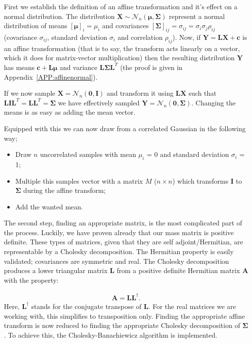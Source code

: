 First we establish the definition of an affine transformation and it's effect on a normal distribution. The distribution $\mathbf{X} \sim \mathcal{N}_n \left( \bm{\mu}, \bm{\Sigma} \right)$ represent a normal distribution of means $\left[\bm{\mu}\right]_i = \mu_i$ and covariances $\left[ \bm{\Sigma} \right]_{ij} = \sigma_{ij} = \sigma_i \sigma_j \rho_{ij}$ (covariance $\sigma_{ij}$, standard deviation $\sigma_i$ and correlation $\rho_{ij}$). Now, if $\mathbf{Y} = \bm{L} \mathbf{X} + \bm{c}$ is an affine transformation (that is to say, the transform acts linearly on a vector, which it does for matrix-vector multiplication) then the resulting distribution $\mathbf{Y}$ has means $\bm{c} + \bm{L}\bm{\mu}$ and variance $\bm{L} \bm{\Sigma} \bm{L}^T$ (the proof is given in Appendix~\ref{APP:affinenormal}).

If we now sample $\mathbf{X} = \mathcal{N}_n \left( \mathbf{0},\mathbf{I} \right)$ and transform it using $\bm{L}\mathbf{X}$ such that $\bm{L}\bm{I}\bm{L}^T = \bm{L}\bm{L}^T = \bm{\Sigma}$ we have effectively sampled $\mathbf{Y} = \mathcal{N}_n \left( \mathbf{0},\mathbf{\Sigma} \right)$. Changing the means is as easy as adding the mean vector.

Equipped with this we can now draw from a correlated Gaussian in the following way;
\begin{itemize}
	\item Draw $n$ uncorrelated samples with mean $\mu_i$ = 0 and standard deviation $\sigma_i$ = 1;
	\item Multiple this samples vector with a matrix $M$ ($n \times n$) which transforms $\mathbf{I}$ to $\mathbf{\Sigma}$ during the affine transform;
	\item Add the wanted mean.
\end{itemize}

The second step, finding an appropriate matrix, is the most complicated part of the process. Luckily, we have proven already that our mass matrix is positive definite. These types of matrices, given that they are self adjoint/Hermitian, are representable by a Cholesky decomposition. The Hermitian property is easily validated; covariances are symmetric and real. The Cholesky decomposition produces a lower triangular matrix $\mathbf{L}$ from a positive definite Hermitian matrix $\mathbf{A}$ with the property:

\begin{align}
	\mathbf{A} = \mathbf{L} \mathbf{L}^\dagger.
\end{align}
Here, $\mathbf{L}^\dagger$ stands for the conjugate transpose of $\mathbf{L}$. For the real matrices we are working with, this simplifies to transposition only. Finding the appropriate affine transform is now reduced to finding the appropriate Cholesky decomposition of $\mathbf{\Sigma}$. To achieve this, the Cholesky-Banachiewicz algorithm is implemented.

